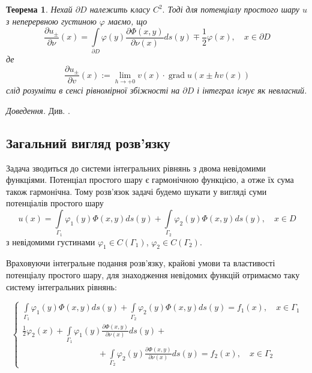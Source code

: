 \documentclass[14pt,a4paper]{extarticle}
\newcounter{e}
\newtheorem{theorem}{Теорема}[section]
\newcommand{\proof}{\textit{Доведення. \space}}
\numberwithin{equation}{section}
\numberwithin{figure}{section}
\newcommand{\intl}{\int\limits}
\begin{document}
 \begin{theorem}
 	 \label{potential-partial-derevative}
	 Нехай $\partial D$ належить класу $C^{2} .$ Тоді для потенціалу простого шару $u$ з неперервною густиною $\varphi$ маємо, що
	 $$
	 \frac{\partial u_{\pm}}{\partial \nu}(x) =
	 \intl_{\partial D} \varphi(y) \frac{\partial \Phi(x, y)}{\partial \nu(x)} d s(y) \mp \frac{1}{2} \varphi(x),
	 \quad x \in \partial D
	 $$
	 де
	 $$
	 \frac{\partial u_{\pm}}{\partial v}(x):=\lim _{h \rightarrow+0} v(x) \cdot \operatorname{grad} u(x \pm h v(x))
	 $$
	 слід розуміти в сенсі рівномірної збіжності на $\partial D$ і інтеграл існує як невласний.
 \end{theorem}
 \proof Див. \cite{kress2012linear}.
 
 \subsection{Загальний вигляд розв'язку}
 
 Задача \boundprob \space зводиться до системи інтегральних рівнянь з двома невідомими функціями.
 Потенціал простого шару є гармонічною функцією, а отже їх сума також гармонічна.
 Тому розв'язок задачі \boundprob \space будемо шукати у вигляді суми потенціалів простого шару
 \begin{equation}
	 \label{potentials-sum-solution}
	 u(x) 
	 = \intl_{\Gamma_1} \varphi_1(y) \Phi(x, y) d s(y)
	 + \intl_{\Gamma_2} \varphi_2(y) \Phi(x, y) d s(y)
	 , \quad x \in D
 \end{equation}
 з невідомими густинами $\varphi_1 \in C(\Gamma_{1}) $, $\varphi_2 \in C(\Gamma_{2})$.
 
 Враховуючи інтегральне подання розв'язку, крайові умови та властивості потенціалу простого шару, для знаходження невідомих функцій отримаємо таку систему інтегральних рівнянь:
 
 \begin{equation}
 	\label{IE-system}
	 \left\{
	 \begin{array}{l}
	 	\displaystyle
	 	  \intl_{\Gamma_{1}} \varphi_1(y) \Phi(x, y) d s(y)
	 	+ \intl_{\Gamma_{2}} \varphi_2(y) \Phi(x, y) d s(y)
	 	= f_{1}(x), \quad x \in \Gamma_{1} 
	 	\\ [1cm]
	 	\displaystyle
	 	\frac{1}{2}\varphi_2(x)
	 	+ \intl_{\Gamma_{1}} \varphi_1(y) \frac{\partial \Phi(x, y)}{\partial \nu(x)} d s(y) +
	 	\\ [0.3cm]
	 	\displaystyle \qquad \qquad \qquad \qquad \quad
	 	+ \intl_{\Gamma_{2}} \varphi_2(y) \frac{\partial \Phi(x, y)}{\partial \nu(x)} d s(y)
	 	= f_{2}(x), \quad x \in \Gamma_{2}
 \end{array}\right.
 \end{equation}
\end{document}
